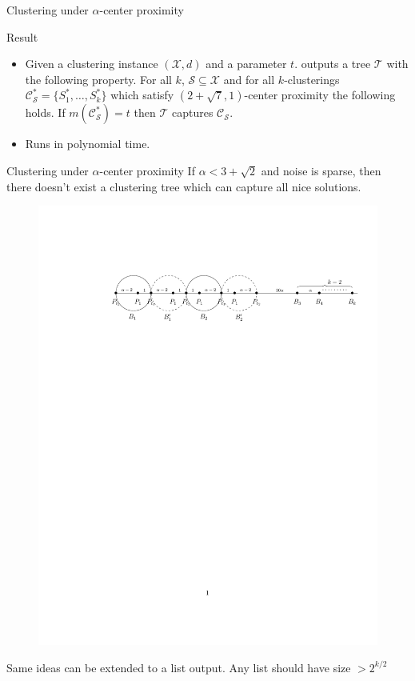 \documentclass{beamer}
\newcommand{\mc}{\mathcal}
\begin{document}
\begin{frame}{Clustering under $\alpha$-center proximity}
	\begin{block}{Result}
	\begin{itemize}
	  \item Given a clustering instance $(\mc X, d)$ and a parameter $t$. outputs a tree $\mc T$ with the following property. For all $k$, $\mc S \subseteq \mc X$ and for all $k$-clusterings $\mc C^*_{\mc S} = \{S_1^*, \ldots, S_k^*\}$ which satisfy $(2+\sqrt{7}, 1)$-center proximity the following holds. If $m(\mc C_{\mc S}^*) = t$ then $\mc T$ captures $\mc C_{\mc S}$.
	  \item Runs in polynomial time.
	\end{itemize}
	\end{block}
\end{frame}

\begin{frame}{Clustering under $\alpha$-center proximity}
	If $\alpha < 3 + \sqrt{2}$ and noise is sparse, then there doesn't exist a clustering tree which can capture all nice solutions.
	\begin{figure}[!t]
	  \begin{center}
	    \includegraphics[trim={47mm 205mm 12mm 44mm},clip,width=\textwidth]{lbdFig2.pdf}
	  \end{center}
	\end{figure}
	Same ideas can be extended to a list output. Any list should have size $> 2^{k/2}$
\end{frame}
\end{document}
